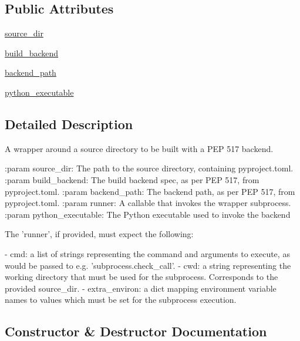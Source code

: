 \subsection*{Public Attributes}
\begin{DoxyCompactItemize}
\item 
\hyperlink{classpip_1_1__vendor_1_1pep517_1_1wrappers_1_1Pep517HookCaller_aab251dbd969837d76cc2849517a313e9}{source\+\_\+dir}
\item 
\hyperlink{classpip_1_1__vendor_1_1pep517_1_1wrappers_1_1Pep517HookCaller_aa13c5b77e490ae5cff1e4a23f8eefcea}{build\+\_\+backend}
\item 
\hyperlink{classpip_1_1__vendor_1_1pep517_1_1wrappers_1_1Pep517HookCaller_a839e0732ae080d960a35a3bff7b9cc44}{backend\+\_\+path}
\item 
\hyperlink{classpip_1_1__vendor_1_1pep517_1_1wrappers_1_1Pep517HookCaller_a19489e9fe7ff61c15c82fe53d0abdd2b}{python\+\_\+executable}
\end{DoxyCompactItemize}


\subsection{Detailed Description}
\begin{DoxyVerb}A wrapper around a source directory to be built with a PEP 517 backend.

:param source_dir: The path to the source directory, containing
    pyproject.toml.
:param build_backend: The build backend spec, as per PEP 517, from
    pyproject.toml.
:param backend_path: The backend path, as per PEP 517, from pyproject.toml.
:param runner: A callable that invokes the wrapper subprocess.
:param python_executable: The Python executable used to invoke the backend

The 'runner', if provided, must expect the following:

- cmd: a list of strings representing the command and arguments to
  execute, as would be passed to e.g. 'subprocess.check_call'.
- cwd: a string representing the working directory that must be
  used for the subprocess. Corresponds to the provided source_dir.
- extra_environ: a dict mapping environment variable names to values
  which must be set for the subprocess execution.
\end{DoxyVerb}
 

\subsection{Constructor \& Destructor Documentation}
\mbox{\label{classpip_1_1__vendor_1_1pep517_1_1wrappers_1_1Pep517HookCaller_a643ba58253daacef75db41d4f7103b00}} 
